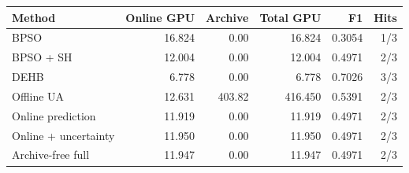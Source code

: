 \begin{tabular}{lrrrrr}\toprule
Method & Online GPU & Archive & Total GPU & F1 & Hits\\\midrule
BPSO & 16.824 & 0.00 & 16.824 & 0.3054 & 1/3\\
BPSO + SH & 12.004 & 0.00 & 12.004 & 0.4971 & 2/3\\
DEHB & 6.778 & 0.00 & 6.778 & 0.7026 & 3/3\\
Offline UA & 12.631 & 403.82 & 416.450 & 0.5391 & 2/3\\
Online prediction & 11.919 & 0.00 & 11.919 & 0.4971 & 2/3\\
Online + uncertainty & 11.950 & 0.00 & 11.950 & 0.4971 & 2/3\\
Archive-free full & 11.947 & 0.00 & 11.947 & 0.4971 & 2/3\\
\bottomrule\end{tabular}
